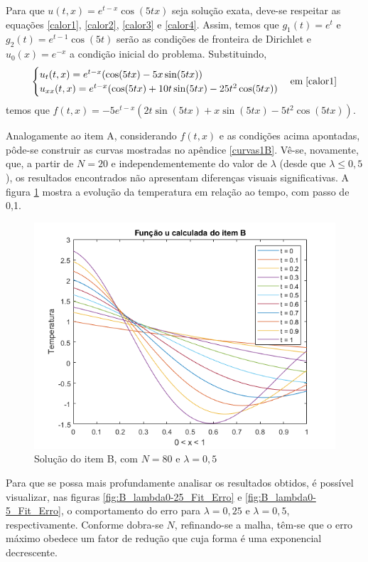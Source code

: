 \documentclass[12pt]{article}
\begin{document}
\begin{spacing}{1.5}
Para que $u(t,x)=e^{t-x}\cos(5tx)$ seja solução exata, deve-se respeitar as equações \eqref{calor1}, \eqref{calor2}, \eqref{calor3} e \eqref{calor4}. Assim, temos que $g_{1}(t) = e^{t}$ e $g_{2}(t) = e^{t-1}\cos(5t)$ serão as condições de fronteira de Dirichlet e $u_{0}(x) = e^{-x}$ a condição inicial do problema. Substituindo,
\begin{equation*}
\begin{cases}
    u_{t}(t,x)=e^{t-x}(\cos(5tx)-5x\sin(5tx)) \\
    u_{xx}(t,x)=e^{t-x}(\cos(5tx)+10t\sin(5tx)-25t^{2}\cos(5tx))
\end{cases} \text{em} \; \eqref{calor1}
\end{equation*}
temos que $ f(t,x)=-5e^{t-x}(2t\sin(5tx)+x\sin(5tx)-5t^{2}\cos(5tx))$.

Analogamente ao item A, considerando $f(t,x)$ e as condições acima apontadas, pôde-se construir as curvas mostradas no apêndice \ref{curvas1B}. Vê-se, novamente, que, a partir de $N=20$ e independementemente do valor de $\lambda$ (desde que $\lambda \leq 0,5$), os resultados encontrados não apresentam diferenças visuais significativas. A figura \ref{fig:itemB_2D} mostra a evolução da temperatura em relação ao tempo, com passo de 0,1.

\begin{figure}[ht!]
    \centering
    \includegraphics[width=0.8\linewidth]{Primeira_Tarefa/ItemB/itemB_2D.png}
    \caption{Solução do item B, com $N=80$ e $\lambda=0,5$}
    \label{fig:itemB_2D}
\end{figure}

Para que se possa mais profundamente analisar os resultados obtidos, é possível visualizar, nas figuras \ref{fig:B_lambda0-25_Fit_Erro} e \ref{fig:B_lambda0-5_Fit_Erro}, o comportamento do erro para $\lambda = 0,25$ e $\lambda = 0,5$, respectivamente. Conforme dobra-se $N$, refinando-se a malha, têm-se que o erro máximo obedece um fator de redução que cuja forma é uma exponencial decrescente.


\end{spacing}
\end{document}
